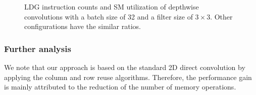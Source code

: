 \begin{figure}
    \centering
    \qquad
    \vspace{5mm}
    \vspace{-4mm}
    \caption{LDG instruction counts and SM utilization of depthwise convolutions with a batch size of 32 and a filter size of $3\times3$. 
    Other configurations have the similar ratios.}
    \label{fig:dwratio}
\end{figure}

\subsubsection{Further analysis}
We note that our approach is based on the standard 2D direct convolution by applying the column and row reuse algorithms. 
Therefore, the performance gain is mainly attributed to the reduction of the number of memory operations. 

